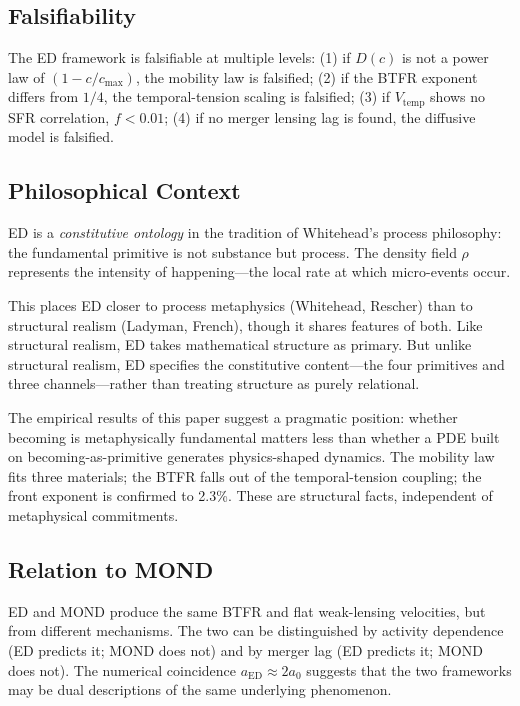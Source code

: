 \documentclass[12pt,letterpaper]{article}
\begin{document}
\subsection{Falsifiability}

The ED framework is falsifiable at multiple levels: (1) if $D(c)$ is not a power law of $(1-c/c_{\max})$, the mobility law is falsified; (2) if the BTFR exponent differs from $1/4$, the temporal-tension scaling is falsified; (3) if $V_{\mathrm{temp}}$ shows no SFR correlation, $f < 0.01$; (4) if no merger lensing lag is found, the diffusive model is falsified.

\subsection{Philosophical Context}

ED is a \emph{constitutive ontology} in the tradition of Whitehead's process philosophy: the fundamental primitive is not substance but process. The density field $\rho$ represents the intensity of happening---the local rate at which micro-events occur.

This places ED closer to process metaphysics (Whitehead, Rescher) than to structural realism (Ladyman, French), though it shares features of both. Like structural realism, ED takes mathematical structure as primary. But unlike structural realism, ED specifies the constitutive content---the four primitives and three channels---rather than treating structure as purely relational.

The empirical results of this paper suggest a pragmatic position: whether becoming is metaphysically fundamental matters less than whether a PDE built on becoming-as-primitive generates physics-shaped dynamics. The mobility law fits three materials; the BTFR falls out of the temporal-tension coupling; the front exponent is confirmed to 2.3\%. These are structural facts, independent of metaphysical commitments.

\subsection{Relation to MOND}

ED and MOND produce the same BTFR and flat weak-lensing velocities, but from different mechanisms. The two can be distinguished by activity dependence (ED predicts it; MOND does not) and by merger lag (ED predicts it; MOND does not). The numerical coincidence $a_{\mathrm{ED}} \approx 2a_0$ suggests that the two frameworks may be dual descriptions of the same underlying phenomenon.
\end{document}

